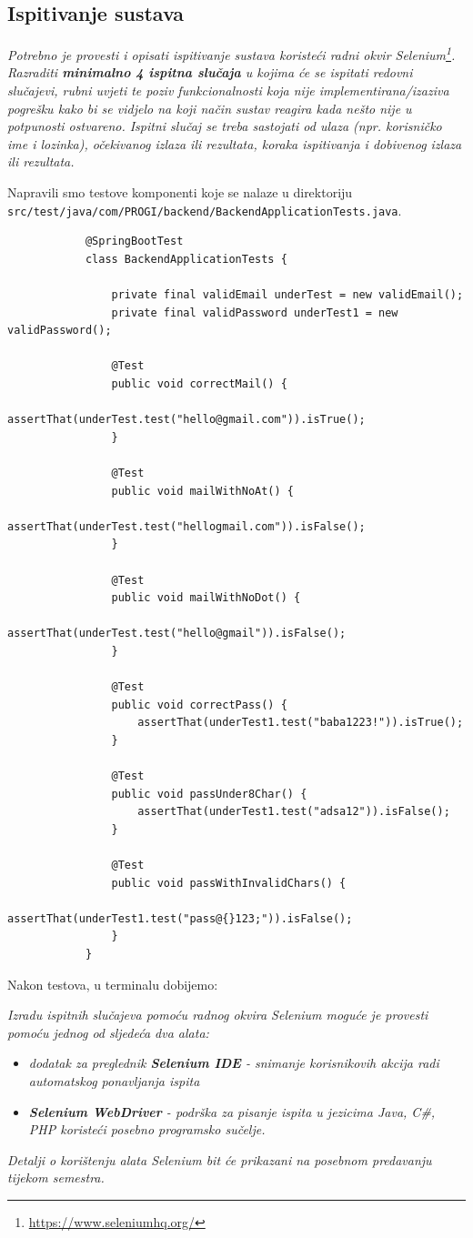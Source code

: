 			
			
			\subsection{Ispitivanje sustava}
			
			 \textit{Potrebno je provesti i opisati ispitivanje sustava koristeći radni okvir Selenium\footnote{\url{https://www.seleniumhq.org/}}. Razraditi \textbf{minimalno 4 ispitna slučaja} u kojima će se ispitati redovni slučajevi, rubni uvjeti te poziv funkcionalnosti koja nije implementirana/izaziva pogrešku kako bi se vidjelo na koji način sustav reagira kada nešto nije u potpunosti ostvareno. Ispitni slučaj se treba sastojati od ulaza (npr. korisničko ime i lozinka), očekivanog izlaza ili rezultata, koraka ispitivanja i dobivenog izlaza ili rezultata.\\ }
			 
			 Napravili smo testove komponenti koje se nalaze u direktoriju \texttt{src/test/java/com/PROGI/backend/BackendApplicationTests.java}.


			\begin{verbatim}
			@SpringBootTest
			class BackendApplicationTests {

				private final validEmail underTest = new validEmail();
				private final validPassword underTest1 = new validPassword();

				@Test
				public void correctMail() {
					assertThat(underTest.test("hello@gmail.com")).isTrue();
				}

				@Test
				public void mailWithNoAt() {
					assertThat(underTest.test("hellogmail.com")).isFalse();
				}

				@Test
				public void mailWithNoDot() {
					assertThat(underTest.test("hello@gmail")).isFalse();
				}

				@Test
				public void correctPass() {
					assertThat(underTest1.test("baba1223!")).isTrue();
				}

				@Test
				public void passUnder8Char() {
					assertThat(underTest1.test("adsa12")).isFalse();
				}

				@Test
				public void passWithInvalidChars() {
					assertThat(underTest1.test("pass@{}123;")).isFalse();
				}
			}
			\end{verbatim}

			Nakon testova, u terminalu dobijemo:

			 \textit{Izradu ispitnih slučajeva pomoću radnog okvira Selenium moguće je provesti pomoću jednog od sljedeća dva alata:}
			 \begin{itemize}
			 	\item \textit{dodatak za preglednik \textbf{Selenium IDE} - snimanje korisnikovih akcija radi automatskog ponavljanja ispita	}
			 	\item \textit{\textbf{Selenium WebDriver} - podrška za pisanje ispita u jezicima Java, C\#, PHP koristeći posebno programsko sučelje.}
			 \end{itemize}
		 	\textit{Detalji o korištenju alata Selenium bit će prikazani na posebnom predavanju tijekom semestra.}
			
